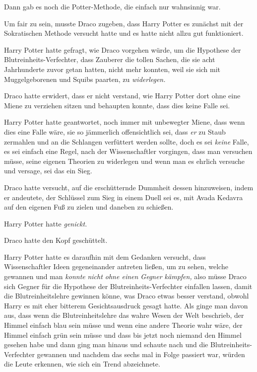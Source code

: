{Dann gab es noch die Potter-Methode, die einfach nur wahnsinnig war.

Um fair zu sein, musste Draco zugeben, dass Harry Potter es zunächst mit der Sokratischen Methode versucht hatte und es hatte nicht allzu gut funktioniert.

Harry Potter hatte gefragt, wie Draco vorgehen würde, um die Hypothese der Blutreinheits-Verfechter, dass Zauberer die tollen Sachen, die sie acht Jahrhunderte zuvor getan hatten, nicht mehr konnten, weil sie sich mit Muggelgeborenen und Squibs paarten, zu \emph{widerlegen.}

Draco hatte erwidert, dass er nicht verstand, wie Harry Potter dort ohne eine Miene zu verziehen sitzen und behaupten konnte, dass dies keine Falle sei.

Harry Potter hatte geantwortet, noch immer mit unbewegter Miene, dass wenn dies eine Falle wäre, sie so jämmerlich offensichtlich sei, dass \emph{er} zu Staub zermahlen und an die Schlangen verfüttert werden sollte, doch es sei \emph{keine} Falle, es sei einfach eine Regel, nach der Wissenschaftler vorgingen, dass man versuchen müsse, seine eigenen Theorien zu widerlegen und wenn man es ehrlich versuche und versage, sei das ein Sieg.

Draco hatte versucht, auf die erschütternde Dummheit dessen hinzuweisen, indem er andeutete, der Schlüssel zum Sieg in einem Duell sei es, mit Avada Kedavra auf den eigenen Fuß zu zielen und daneben zu schießen.

Harry Potter hatte \emph{genickt.}

Draco hatte den Kopf geschüttelt.

Harry Potter hatte es daraufhin mit dem Gedanken versucht, dass Wissenschaftler Ideen gegeneinander antreten ließen, um zu sehen, welche gewannen und man \emph{konnte} \emph{nicht ohne einen Gegner kämpfen,} also müsse Draco sich Gegner für die Hypothese der Blutreinheits-Verfechter einfallen lassen, damit die Blutreinheitslehre gewinnen könne, was Draco etwas besser verstand, obwohl Harry es mit eher bitterem Gesichtsausdruck gesagt hatte. Als ginge man davon aus, dass wenn die Blutreinheitslehre das wahre Wesen der Welt beschrieb, der Himmel einfach blau sein müsse und wenn eine andere Theorie wahr wäre, der Himmel einfach grün sein müsse und dass bis jetzt noch niemand den Himmel gesehen habe und dann ging man hinaus und schaute nach und die Blutreinheits-Verfechter gewannen und nachdem das sechs mal in Folge passiert war, würden die Leute erkennen, wie sich ein Trend abzeichnete.

}
